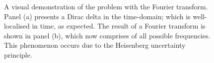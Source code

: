 \begin{figure}[htpb]
	\centering\capstart{}
    \hfill
	\caption[
        A Dirac delta function and the result of a Fourier transform
	]{
        A visual demonstration of the problem with the Fourier transform.
        Panel (a) presents a Dirac delta in the time-domain; which is well-localised in time, as expected.
        The result of a Fourier transform is shown in panel (b), which now comprises of all possible frequencies.
        This phenomenon occurs due to the Heisenberg uncertainty principle.
	}\label{fig:chapter2_dirac_fourier}
\end{figure}

